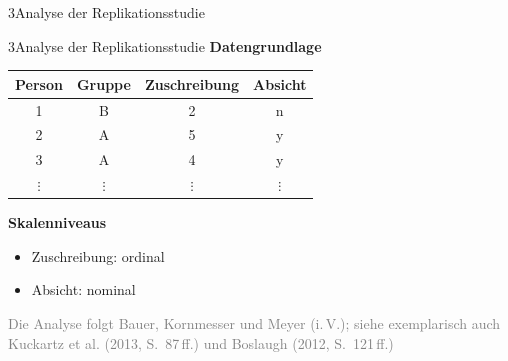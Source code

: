 \documentclass[xcolor=table,9pt,aspectratio=169]{beamer}
\begin{document}
\begin{frame}
\begin{overlayarea}{\textwidth}{0.81\paperheight}{
   \vspace*{11mm}
   \textcolor{uolblue}
   {3\hspace*{1em}Analyse der Replikationsstudie}
}
\end{overlayarea}
\end{frame}


\begin{frame}{\vspace*{10mm}3\hspace*{1em}Analyse der Replikationsstudie}
\textbf{Datengrundlage}\\
\smallskip
\begin{tabular}[h]{cccc}
   \arrayrulecolor{blue2}\hline
   Person     & Gruppe     & Zuschreibung   & Absicht    \\
   \hline
   1          & B          & 2              & n          \\
   2          & A          & 5              & y          \\
   3          & A          & 4              & y          \\
   $\vdots$   & $\vdots$   & $\vdots$       & $\vdots$   \\
   \hline
\end{tabular}

\bigskip
\textbf{Skalenniveaus}\\
\begin{itemize}
   \item Zuschreibung: ordinal
   \item Absicht: nominal
\end{itemize}

\bigskip
\textcolor{gray}{Die Analyse folgt Bauer, Kornmesser und Meyer (i.\,V.); siehe exemplarisch auch Kuckartz et al. (2013, S.~87\,ff.) und Boslaugh (2012, S.~121\,ff.)}

\end{frame}
\end{document}
